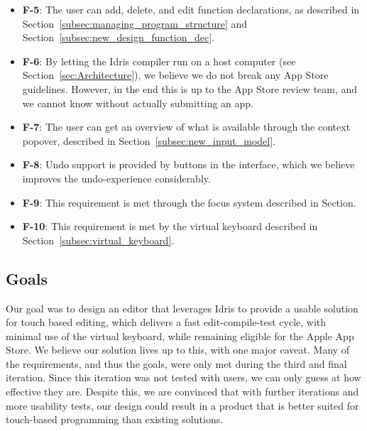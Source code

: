 \begin{itemize}
	\item \textbf{F-5}: The user can add, delete, and edit function declarations, as described in Section~\ref{subsec:managing_program_structure} and Section~\ref{subsec:new_design_function_dec}.
	\item \textbf{F-6}: By letting the Idris compiler run on a host computer (see Section~\ref{sec:Architecture}), we believe we do not break any App Store guidelines. However, in the end this is up to the App Store review team, and we cannot know without actually submitting an app.
	\item \textbf{F-7}: The user can get an overview of what is available through the context popover, described in Section~\ref{subsec:new_input_model}.
	\item \textbf{F-8}: Undo support is provided by buttons in the interface, which we believe improves the undo-experience considerably.
	\item \textbf{F-9}: This requirement is met through the focus system described in Section.
	\item \textbf{F-10}: This requirement is met by the virtual keyboard described in Section~\ref{subsec:virtual_keyboard}.
\end{itemize}

\subsection{Goals}
Our goal was to design an editor that leverages Idris to provide a usable solution for touch based editing, which delivers a fast edit-compile-test cycle, with minimal use of the virtual keyboard, while remaining eligible for the Apple App Store.
We believe our solution lives up to this, with one major caveat. Many of the requirements, and thus the goals, were only met during the third and final iteration.
Since this iteration was not tested with users, we can only guess at how effective they are.
Despite this, we are convinced that with further iterations and more usability tests, our design could result in a product that is better suited for touch-based programming than existing solutions.
